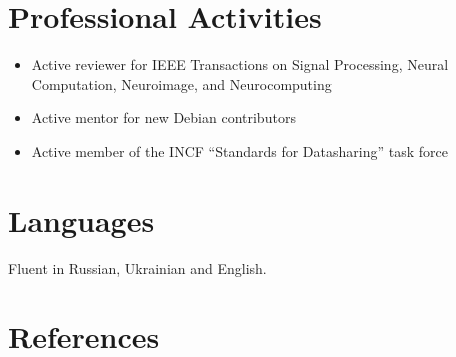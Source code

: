 \documentclass[12pt,overlapped,line]{res}
\begin{document}
\begin{resume}
\begin{itemize}
\end{itemize}

\section{Professional Activities}
\begin{itemize}
\item Active reviewer for IEEE Transactions on Signal Processing,
  Neural Computation, Neuroimage, and Neurocomputing
\item Active mentor for new Debian contributors
\item Active member of the INCF ``Standards for Datasharing'' task force
\end{itemize}


\section{Languages}
 Fluent in Russian, Ukrainian and English.

 \section{References}


\end{resume}
\end{document}

